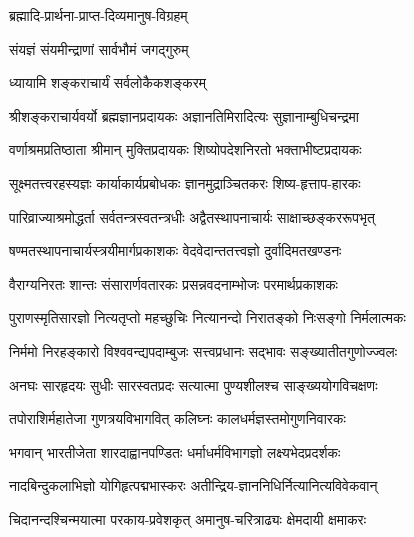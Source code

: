

{ब्रह्मादि-प्रार्थना-प्राप्त-दिव्यमानुष-विग्रहम्}

{संयज्ञं संयमीन्द्राणां सार्वभौमं जगद्गुरुम्}

{ध्यायामि शङ्कराचार्यं सर्वलोकैकशङ्करम् }

\twolineshloka
{श्रीशङ्कराचार्यवर्यो ब्रह्मज्ञानप्रदायकः}
{अज्ञानतिमिरादित्यः सुज्ञानाम्बुधिचन्द्रमा}

\twolineshloka
{वर्णाश्रमप्रतिष्ठाता श्रीमान् मुक्तिप्रदायकः}
{शिष्योपदेशनिरतो भक्ताभीष्टप्रदायकः}

\twolineshloka
{सूक्ष्मतत्त्वरहस्यज्ञः कार्याकार्यप्रबोधकः}
{ज्ञानमुद्राञ्चितकरः शिष्य-हृत्ताप-हारकः}

\twolineshloka
{पारिव्राज्याश्रमोद्धर्ता सर्वतन्त्रस्वतन्त्रधीः}
{अद्वैतस्थापनाचार्यः साक्षाच्छङ्कररूपभृत्}

\twolineshloka
{षण्मतस्थापनाचार्यस्त्रयीमार्गप्रकाशकः}
{वेदवेदान्ततत्त्वज्ञो दुर्वादिमतखण्डनः}

\twolineshloka
{वैराग्यनिरतः शान्तः संसारार्णवतारकः}
{प्रसन्नवदनाम्भोजः परमार्थप्रकाशकः}

\twolineshloka
{पुराणस्मृतिसारज्ञो नित्यतृप्तो महच्छुचिः}
{नित्यानन्दो निरातङ्को निःसङ्गो निर्मलात्मकः}

\twolineshloka
{निर्ममो निरहङ्कारो विश्ववन्द्यपदाम्बुजः}
{सत्त्वप्रधानः सद्भावः सङ्ख्यातीतगुणोज्ज्वलः}

\twolineshloka
{अनघः सारहृदयः सुधीः सारस्वतप्रदः}
{सत्यात्मा पुण्यशीलश्च साङ्ख्ययोगविचक्षणः}

\twolineshloka
{तपोराशिर्महातेजा गुणत्रयविभागवित्}
{कलिघ्नः कालधर्मज्ञस्तमोगुणनिवारकः}

\twolineshloka
{भगवान् भारतीजेता शारदाह्वानपण्डितः}
{धर्माधर्मविभागज्ञो लक्ष्यभेदप्रदर्शकः}

\twolineshloka
{नादबिन्दुकलाभिज्ञो योगिहृत्पद्मभास्करः}
{अतीन्द्रिय-ज्ञाननिधिर्नित्यानित्यविवेकवान्}

\twolineshloka
{चिदानन्दश्चिन्मयात्मा परकाय-प्रवेशकृत्}
{अमानुष-चरित्राढ्यः क्षेमदायी क्षमाकरः}

